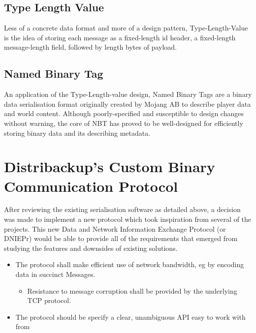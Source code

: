 \documentclass[12pt,a4paper,]{adreport}
\begin{document}
\subsection{Type Length Value}\label{type-length-value}

Less of a concrete data format and more of a design pattern,
Type-Length-Value is the idea of storing each message as a fixed-length
id header, a fixed-length message-length field, followed by length bytes
of payload.

\subsection{Named Binary Tag}\label{named-binary-tag}

An application of the Type-Length-value design, Named Binary Tags are a
binary data serialisation format originally created by Mojang AB to
describe player data and world content. Although poorly-specified and
susceptible to design changes without warning, the core of NBT has
proved to be well-designed for efficiently storing binary data and its
describing metadata.

\section{Distribackup's Custom Binary Communication
Protocol}\label{distribackups-custom-binary-communication-protocol}

After reviewing the existing serialisation software as detailed above, a
decision was made to implement a new protocol which took inspiration
from several of the projects. This new Data and Network Information
Exchange Protocol (or DNIEPr) would be able to provide all of the
requirements that emerged from studying the features and downsides of
existing solutions.

\begin{itemize}
\itemsep1pt\parskip0pt
\item
  The protocol shall make efficient use of network bandwidth, eg by
  encoding data in succinct Messages.

  \begin{itemize}
  \itemsep1pt\parskip0pt
  \item
    Resistance to message corruption shall be provided by the underlying
    TCP protocol.
  \end{itemize}
\item
  The protocol should be specify a clear, unambiguous API easy to work
  with from
\end{itemize}
\end{document}
